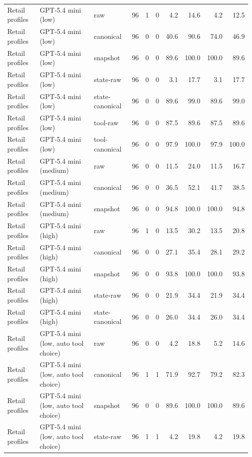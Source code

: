{\begin{longtable}{lllrrrrrrr}
\midrule
Retail profiles & GPT-5.4 mini (low) & raw & 96 & 1 & 0 & 4.2 & 14.6 & 4.2 & 12.5 \\
Retail profiles & GPT-5.4 mini (low) & canonical & 96 & 0 & 0 & 40.6 & 90.6 & 74.0 & 46.9 \\
Retail profiles & GPT-5.4 mini (low) & snapshot & 96 & 0 & 0 & 89.6 & 100.0 & 100.0 & 89.6 \\
Retail profiles & GPT-5.4 mini (low) & state-raw & 96 & 0 & 0 & 3.1 & 17.7 & 3.1 & 17.7 \\
Retail profiles & GPT-5.4 mini (low) & state-canonical & 96 & 0 & 0 & 89.6 & 99.0 & 89.6 & 99.0 \\
Retail profiles & GPT-5.4 mini (low) & tool-raw & 96 & 0 & 0 & 87.5 & 89.6 & 87.5 & 89.6 \\
Retail profiles & GPT-5.4 mini (low) & tool-canonical & 96 & 0 & 0 & 97.9 & 100.0 & 97.9 & 100.0 \\
Retail profiles & GPT-5.4 mini (medium) & raw & 96 & 0 & 0 & 11.5 & 24.0 & 11.5 & 16.7 \\
Retail profiles & GPT-5.4 mini (medium) & canonical & 96 & 0 & 0 & 36.5 & 52.1 & 41.7 & 38.5 \\
Retail profiles & GPT-5.4 mini (medium) & snapshot & 96 & 0 & 0 & 94.8 & 100.0 & 100.0 & 94.8 \\
Retail profiles & GPT-5.4 mini (high) & raw & 96 & 1 & 0 & 13.5 & 30.2 & 13.5 & 20.8 \\
Retail profiles & GPT-5.4 mini (high) & canonical & 96 & 0 & 0 & 27.1 & 35.4 & 28.1 & 29.2 \\
Retail profiles & GPT-5.4 mini (high) & snapshot & 96 & 0 & 0 & 93.8 & 100.0 & 100.0 & 93.8 \\
Retail profiles & GPT-5.4 mini (high) & state-raw & 96 & 0 & 0 & 21.9 & 34.4 & 21.9 & 34.4 \\
Retail profiles & GPT-5.4 mini (high) & state-canonical & 96 & 0 & 0 & 26.0 & 34.4 & 26.0 & 34.4 \\
Retail profiles & GPT-5.4 mini (low, auto tool choice) & raw & 96 & 0 & 0 & 4.2 & 18.8 & 5.2 & 14.6 \\
Retail profiles & GPT-5.4 mini (low, auto tool choice) & canonical & 96 & 1 & 1 & 71.9 & 92.7 & 79.2 & 82.3 \\
Retail profiles & GPT-5.4 mini (low, auto tool choice) & snapshot & 96 & 0 & 0 & 89.6 & 100.0 & 100.0 & 89.6 \\
Retail profiles & GPT-5.4 mini (low, auto tool choice) & state-raw & 96 & 1 & 1 & 4.2 & 19.8 & 4.2 & 19.8 \\

\end{longtable}}
